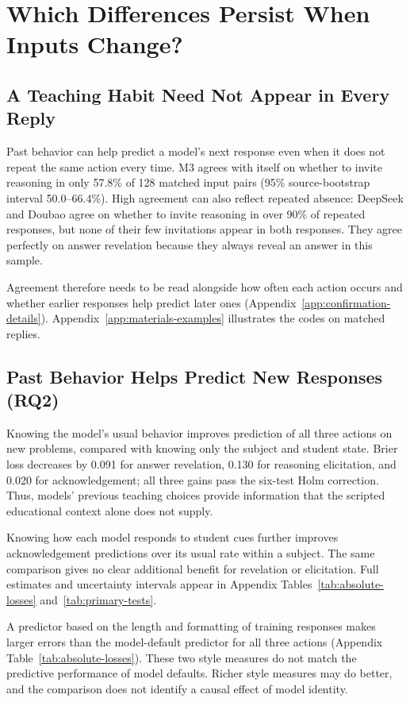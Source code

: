 \section{Which Differences Persist When Inputs Change?}
\label{sec:stability}

\subsection{A Teaching Habit Need Not Appear in Every Reply}
Past behavior can help predict a model's next response even when it does not
repeat the same action every time. M3 agrees with itself on whether to invite
reasoning in only 57.8\% of 128 matched input pairs (95\% source-bootstrap
interval 50.0--66.4\%). High agreement can also reflect repeated absence:
DeepSeek and Doubao agree on whether to invite reasoning in over 90\% of
repeated responses, but none of their few invitations appear in both responses. They agree perfectly on answer
revelation because they always reveal an answer in this sample.

Agreement therefore needs to be read alongside how often each action occurs
and whether earlier responses help predict later ones
(Appendix~\ref{app:confirmation-details}).
Appendix~\ref{app:materials-examples} illustrates the codes on matched replies.

\subsection{Past Behavior Helps Predict New Responses (RQ2)}
Knowing the model's usual behavior improves prediction of all three actions
on new problems, compared with knowing only the subject and student state.
Brier loss decreases by 0.091 for answer revelation, 0.130 for reasoning
elicitation, and 0.020 for acknowledgement; all three gains pass the six-test
Holm correction. Thus, models' previous teaching choices provide information
that the scripted educational context alone does not supply.

Knowing how each model responds to student cues further improves acknowledgement
predictions over its usual rate within a subject. The same comparison gives no
clear additional benefit for revelation or elicitation. Full estimates and
uncertainty intervals appear in Appendix Tables~\ref{tab:absolute-losses}
and~\ref{tab:primary-tests}.

A predictor based on the length and formatting of training responses makes larger errors
than the model-default predictor for all three actions
(Appendix Table~\ref{tab:absolute-losses}). These two style measures do not
match the predictive performance of model defaults. Richer style measures may
do better, and the comparison does not identify a causal effect of model identity.


